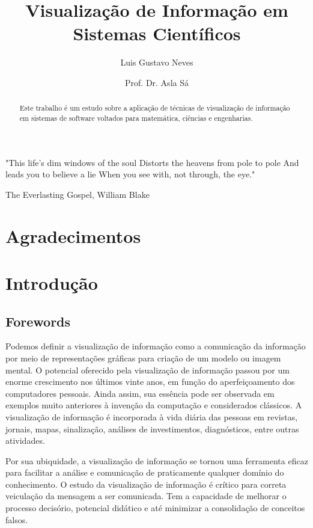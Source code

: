 \documentclass[]{article}
\title{Visualização de Informação em Sistemas Científicos}
\author{Luis Gustavo Neves 
\and Prof. Dr. Asla Sá}
\begin{document}
\maketitle

\begin{abstract}

Este trabalho é um estudo sobre a aplicação de técnicas de visualização de informação em sistemas de software voltados para matemática, ciências e engenharias. 

\end{abstract}

\epigraph{"This life's dim windows of the soul
Distorts the heavens from pole to pole
And leads you to believe a lie
When you see with, not through, the eye."}{The Everlasting Gospel, William Blake}

\section{Agradecimentos}

\section{Introdução} 

\subsection{Forewords}

Podemos definir a visualização de informação como a comunicação da informação por meio de representações gráficas para criação de um modelo ou imagem mental. O potencial oferecido pela visualização de informação passou por um enorme crescimento nos últimos vinte anos, em função do aperfeiçoamento dos computadores pessoais. Ainda assim, sua essência pode ser observada em exemplos muito anteriores à invenção da computação e considerados clássicos. A visualização de informação é incorporada à vida diária das pessoas em revistas, jornais, mapas, sinalização, análises de investimentos, diagnósticos, entre outras atividades.

Por sua ubiquidade, a visualização de informação se tornou uma ferramenta eficaz para facilitar a análise e comunicação de praticamente qualquer domínio do conhecimento. O estudo da visualização de informação é crítico para correta veiculação da mensagem a ser comunicada. Tem a capacidade de melhorar o processo decisório, potencial didático e até minimizar a consolidação de conceitos falsos.
\end{document}

